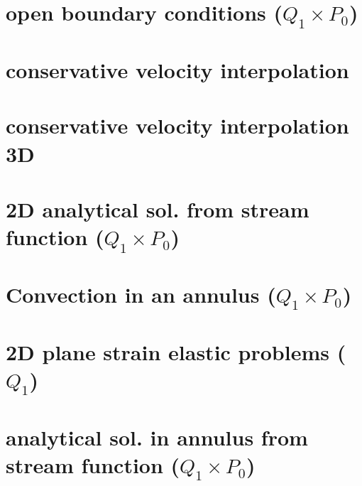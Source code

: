 \documentclass[a4paper,11pt]{report}
\begin{document}
\chapter{open boundary conditions ($Q_1\times P_0$)\label{f29}} %

\chapter{conservative velocity interpolation \label{f30}} %

\chapter{conservative velocity interpolation 3D \label{f31}} %

\chapter{2D analytical sol. from stream function ($Q_1\times P_0$)\label{f32}} %

\chapter{Convection in an annulus  ($Q_1\times P_0$)  \label{f33}} %

\chapter{2D plane strain elastic problems ($Q_1$)\label{f34}} %

\chapter{analytical sol. in annulus from stream function ($Q_1\times P_0$) \label{f35}} %
\end{document}
